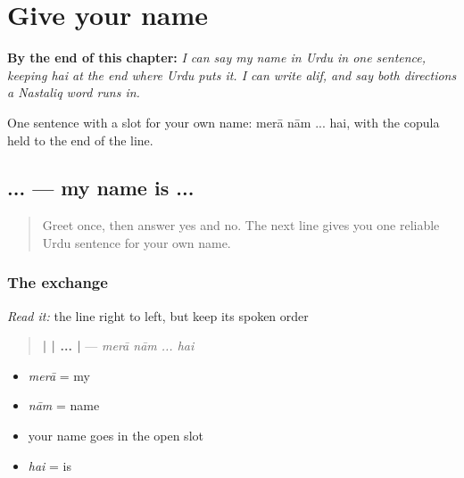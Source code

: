 
\chapter{Give your name}
\label{ch:urdu-name}

\begin{chapteropening}
\textbf{By the end of this chapter:} \emph{I can say my name in Urdu in one sentence, keeping hai at the end where Urdu puts it. I can write alif, and say both directions a Nastaliq word runs in.}

One sentence with a slot for your own name: merā nām ... hai, with the copula held to the end of the line.
\end{chapteropening}

\section[\texorpdfstring{\ur{میرا} \ur{نام} ... \ur{ہے} (merā nām ... hai)}{میرا نام ... ہے (merā nām ... hai)}]{  ...  — my name is ...}

\label{lesson:UR-C02-mera-naam}



\begin{quote}
Greet once, then answer yes and no. The next line gives you one reliable Urdu sentence for your own name.
\end{quote}

\subsection*{The exchange}
\emph{Read it:} the line right to left, but keep its spoken order

\begin{quote}
\textbf{ |  | ... | } — \emph{merā nām ... hai}
\end{quote}

\begin{itemize}
\raggedright
  \item \textbf{} \emph{merā} = my
  \item \textbf{} \emph{nām} = name
  \item your name goes in the open slot
  \item \textbf{} \emph{hai} = is
\end{itemize}

